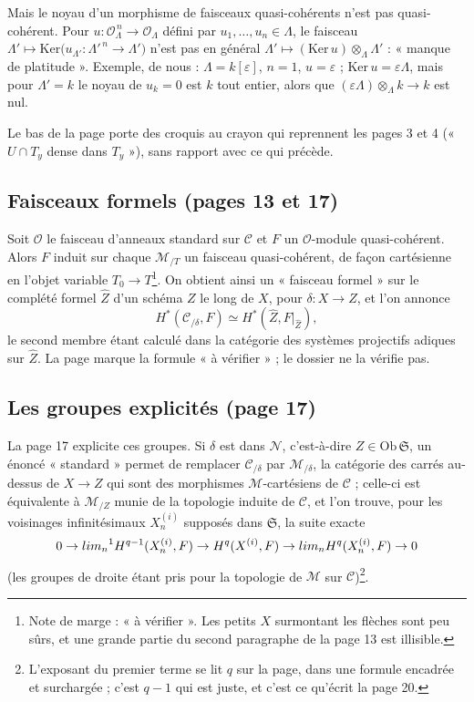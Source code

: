 \documentclass[11pt,a4paper]{article}
\begin{document}
Mais le noyau d'un morphisme de faisceaux quasi-cohérents n'est pas
quasi-cohérent. Pour $u \colon \mathcal{O}_\Lambda^{\,n} \to
\mathcal{O}_\Lambda$ défini par $u_1, \ldots, u_n \in \Lambda$, le faisceau
$\Lambda' \mapsto \mathrm{Ker}\bigl(u_{\Lambda'} \colon \Lambda'^{\,n} \to
\Lambda'\bigr)$ n'est pas en général $\Lambda' \mapsto (\mathrm{Ker}\, u)
\otimes_\Lambda \Lambda'$ : « manque de platitude ». Exemple, de nous :
$\Lambda = k[\varepsilon]$, $n = 1$, $u = \varepsilon$ ; $\mathrm{Ker}\, u =
\varepsilon \Lambda$, mais pour $\Lambda' = k$ le noyau de $u_k = 0$ est $k$
tout entier, alors que $(\varepsilon\Lambda) \otimes_\Lambda k \to k$ est nul.

Le bas de la page porte des croquis au crayon qui reprennent les pages 3 et 4
(« $U \cap T_y$ dense dans $T_y$ »), sans rapport avec ce qui précède.

\subsection*{Faisceaux formels (pages 13 et 17)}

Soit $\mathcal{O}$ le faisceau d'anneaux standard sur $\mathcal{C}$ et $F$ un
$\mathcal{O}$-module quasi-cohérent. Alors $F$ induit sur chaque
$\mathcal{M}_{/T}$ un faisceau quasi-cohérent, de façon cartésienne en l'objet
variable $T_0 \to T$\footnote{Note de marge : « à vérifier ». Les petits $X$
surmontant les flèches sont peu sûrs, et une grande partie du second
paragraphe de la page 13 est illisible.}. On obtient ainsi un « faisceau
formel » sur le complété formel $\widehat{Z}$ d'un schéma $Z$ le long de
$X$, pour $\delta \colon X \to Z$, et l'on annonce
\[
  H^*(\mathcal{C}_{/\delta}, F) \simeq H^*(\widehat{Z}, F|_{\widehat{Z}}) ,
\]
le second membre étant calculé dans la catégorie des systèmes projectifs
adiques sur $\widehat{Z}$. La page marque la formule « à vérifier » ; le dossier
ne la vérifie pas.

\subsection*{Les groupes explicités (page 17)}

La page 17 explicite ces groupes. Si $\delta$ est dans $\mathcal{N}$,
c'est-à-dire $Z \in \mathrm{Ob}\, \mathfrak{S}$, un énoncé « standard »
permet de remplacer $\mathcal{C}_{/\delta}$ par $\mathcal{M}_{/\delta}$, la
catégorie des carrés au-dessus de $X \to Z$ qui sont des morphismes
$\mathcal{M}$-cartésiens de $\mathcal{C}$ ; celle-ci est équivalente à
$\mathcal{M}_{/Z}$ munie de la topologie induite de $\mathcal{C}$, et l'on trouve,
pour les voisinages infinitésimaux $X^{(i)}_n$ supposés dans $\mathfrak{S}$, la
suite exacte
\[
  0 \to {\varprojlim_n}^{1} H^{q-1}(X^{(i)}_n, F) \to H^q(X^{(i)}, F) \to
  \varprojlim_n H^q(X^{(i)}_n, F) \to 0
\]
(les groupes de droite étant pris pour la topologie de $\mathcal{M}$ sur
$\mathcal{C}$)\footnote{L'exposant du premier terme se lit $q$ sur la page,
dans une formule encadrée et surchargée ; c'est $q - 1$ qui est juste, et c'est
ce qu'écrit la page 20.}.
\end{document}
